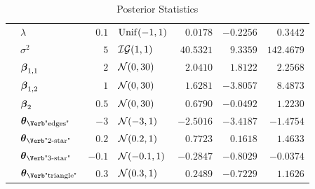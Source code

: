 \begin{table}[t]
\begin{tabular}{cl|rlrrr}
		\midrule
        & $\lambda$                          & $0.1$  & $\mathrm{Unif}(-1,1)$     & $0.0178$  & $-0.2256$ & $0.3442$   \\
        & $\sigma^2$                         & $5$    & $\mathcal{IG}(1,1)$ & $40.5321$ & $9.3359$  & $142.4679$ \\
        & $\boldsymbol{\beta}_{1,1}$                     & $2$    & $\mathcal{N}(0,30)$      & $2.0410$  & $1.8122$  & $2.2568$   \\
        & $\boldsymbol{\beta}_{1,2}$                     & $1$    & $\mathcal{N}(0,30)$      & $1.6281$  & $-3.8057$ & $8.4873$   \\
        & $\boldsymbol{\beta}_{2}$                       & $0.5$  & $\mathcal{N}(0,30)$      & $0.6790$  & $-0.0492$ & $1.2230$   \\
        & $\ttheta_{\text{\Verb"edges"}}$    & $-3$   & $\mathcal{N}(-3,1)$      & $-2.5016$ & $-3.4187$ & $-1.4754$  \\
        & $\ttheta_{\text{\Verb"2-star"}}$   & $0.2$  & $\mathcal{N}(0.2,1)$     & $0.7723$  & $0.1618$  & $1.4633$   \\
        & $\ttheta_{\text{\Verb"3-star"}}$   & $-0.1$ & $\mathcal{N}(-0.1,1)$    & $-0.2847$ & $-0.8029$ & $-0.0374$  \\
        & $\ttheta_{\text{\Verb"triangle"}}$ & $0.3$  & $\mathcal{N}(0.3,1)$     & $0.2489$  & $-0.7229$ & $1.1626$   \\
		\bottomrule
	\end{tabular}
	\caption{Posterior Statistics}
	\label{tab:K1}
\end{table}
